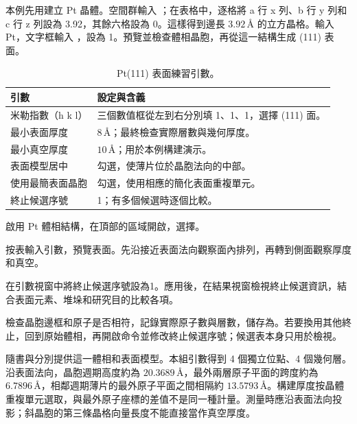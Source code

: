 本例先用建立 Pt 晶體。空間群輸入 ；在表格中，逐格將 a 行 x 列、b 行 y 列和 c 行 z 列設為 3.92，其餘六格設為 0。這樣得到邊長 $3.92\,\text{\AA}$ 的立方晶格。輸入 Pt，文字框輸入 ，設為 1。預覽並檢查體相晶胞，再從這一結構生成 (111) 表面。

\begin{table}[htbp]
\centering
\caption{Pt(111) 表面練習引數。}
\begin{tabularx}{\linewidth}{lX}
\toprule
引數 & 設定與含義 \\
\midrule
米勒指數（h k l） & 三個數值框從左到右分別填 1、1、1，選擇 (111) 面。\\
最小表面厚度 & $8\,\text{\AA}$；最終檢查實際層數與幾何厚度。\\
最小真空厚度 & $10\,\text{\AA}$；用於本例構建演示。\\
表面模型居中 & 勾選，使薄片位於晶胞法向的中部。\\
使用最簡表面晶胞 & 勾選，使用相應的簡化表面重複單元。\\
終止候選序號 & 1；有多個候選時逐個比較。\\
\bottomrule
\end{tabularx}
\end{table}

\begin{steps}
  \item 啟用 Pt 體相結構，在頂部的區域開啟，選擇。
  \item 按表輸入引數，預覽表面。先沿接近表面法向觀察面內排列，再轉到側面觀察厚度和真空。
  \item 在引數視窗中將終止候選序號設為1。應用後，在結果視窗檢視終止候選資訊，結合表面元素、堆垛和研究目的比較各項。
  \item 檢查晶胞邊框和原子是否相符，記錄實際原子數與層數，儲存為。若要換用其他終止，回到原始體相，再開啟命令並修改終止候選序號；候選表本身只用於檢視。
\end{steps}



隨書與分別提供這一體相和表面模型。本組引數得到 4 個獨立位點、4 個幾何層。沿表面法向，晶胞週期高度約為 $20.3689\,\text{\AA}$，最外兩層原子平面的跨度約為 $6.7896\,\text{\AA}$，相鄰週期薄片的最外原子平面之間相隔約 $13.5793\,\text{\AA}$。構建厚度按晶體重複單元選取，與最外原子座標的差值不是同一種計量。測量時應沿表面法向投影；斜晶胞的第三條晶格向量長度不能直接當作真空厚度。

